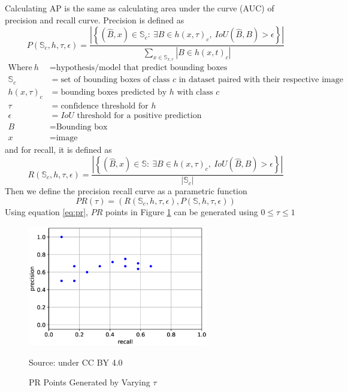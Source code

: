   Calculating AP is the same as calculating area under the curve (AUC) of precision and recall curve.
  Precision is defined as
  \begin{equation}
    P(\mathbb{S}_c,h,\tau,\epsilon) = \dfrac{\left|\left\{(\hat{B},x) \in \mathbb{S}_c :\ \exists B \in h(x,\tau)_c,\ IoU(\hat{B},B) > \epsilon  \right\}\right|}{\displaystyle\sum_{x\in \mathbb{S}_{x,c}} |{B \in h(x,t)_c}|}
    \label{eq:precision}
  \end{equation}
  \begin{align*}
    \text{Where}~ h &=  \text{hypothesis/model that predict bounding boxes}\\%
    \mathbb{S}_c &= \text{set of bounding boxes of class $c$ in dataset paired with their respective image}\\
    h(x,\tau)_c &= \text{bounding boxes predicted by $h$ with class $c$}\\
    \tau &= \text{confidence threshold for $h$} \\
    \epsilon &= \text{$IoU$ threshold for a positive prediction}\\
    B &= \text{Bounding box}\\
    x &= \text{image}
  \end{align*}
  and for recall, it is defined as
  \begin{equation}
    R(\mathbb{S}_c,h,\tau,\epsilon) = \dfrac{\left|\left\{(\hat{B},x) \in \mathbb{S} :\ \exists B \in h(x,\tau)_c,\ IoU(\hat{B},B) > \epsilon  \right\}\right|}{\left| \mathbb{S}_c \right|}
    \label{eq:recall}
  \end{equation}
  Then we define the precision recall curve as a parametric function
  \begin{equation}
    PR(\tau) = \left( R(\mathbb{S}_c,h,\tau,\epsilon),P(\mathbb{S},h,\tau,\epsilon) \right)
    \label{eq:pr}
  \end{equation}
  Using equation \ref{eq:pr}, $PR$ points in Figure \ref{fig:pr-curve} can be generated using $0 \leq \tau \leq 1$
  \begin{figure}[p]
        \centering
        \includegraphics[width=0.7\textwidth]{figures/pr-curve.png}
        \caption*{Source: \textcite{map-hui} under CC BY 4.0}
        \vspace{-2ex}
        \caption{PR Points Generated by Varying $\tau$}
        \label{fig:pr-curve}
  \end{figure}
